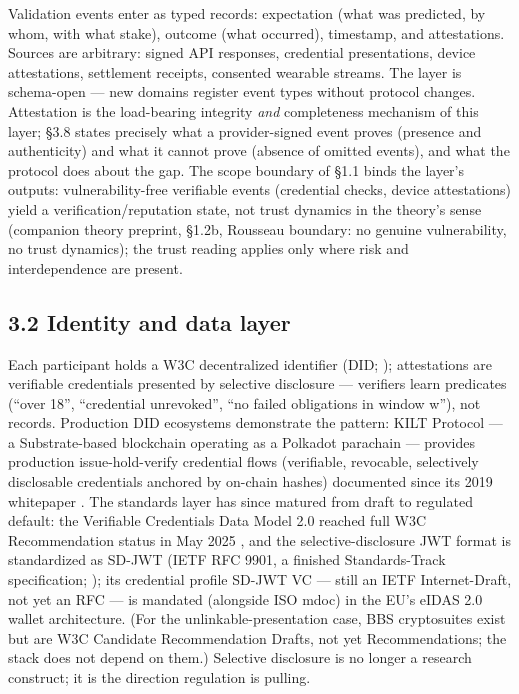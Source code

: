 \documentclass[11pt,twocolumn]{article}
\begin{document}
Validation events enter as typed records: expectation (what was
predicted, by whom, with what stake), outcome (what occurred),
timestamp, and attestations. Sources are arbitrary: signed API
responses, credential presentations, device attestations, settlement
receipts, consented wearable streams. The layer is schema-open --- new
domains register event types without protocol changes. Attestation is
the load-bearing integrity \emph{and} completeness mechanism of this
layer; §3.8 states precisely what a provider-signed event proves
(presence and authenticity) and what it cannot prove (absence of omitted
events), and what the protocol does about the gap. The scope boundary of
§1.1 binds the layer's outputs: vulnerability-free verifiable events
(credential checks, device attestations) yield a verification/reputation
state, not trust dynamics in the theory's sense (companion theory preprint, §1.2b, Rousseau
boundary: no genuine vulnerability, no trust dynamics); the trust
reading applies only where risk and interdependence are present.

\subsection*{3.2 Identity and data layer}

Each participant holds a W3C decentralized identifier (DID;
\citealp{w3c2022did}); attestations are verifiable credentials presented
by selective disclosure --- verifiers learn predicates (``over 18'',
``credential unrevoked'', ``no failed obligations in window w''), not
records. Production DID ecosystems demonstrate the pattern: KILT
Protocol --- a Substrate-based blockchain operating as a Polkadot
parachain --- provides production issue-hold-verify credential flows
(verifiable, revocable, selectively disclosable credentials anchored by
on-chain hashes) documented since its 2019 whitepaper \citep{kilt2019}.
The standards layer has since matured from draft to regulated default:
the Verifiable Credentials Data Model 2.0 reached full W3C
Recommendation status in May 2025 \citep{w3c2025vc}, and the
selective-disclosure JWT format is standardized as SD-JWT (IETF RFC
9901, a finished Standards-Track specification; \citealp{rfc9901}); its
credential profile SD-JWT VC --- still an IETF Internet-Draft, not yet
an RFC --- is mandated (alongside ISO mdoc) in the EU's eIDAS 2.0 wallet
architecture. (For the unlinkable-presentation case, BBS cryptosuites
exist but are W3C Candidate Recommendation Drafts, not yet
Recommendations; the stack does not depend on them.) Selective
disclosure is no longer a research construct; it is the direction
regulation is pulling.
\end{document}
